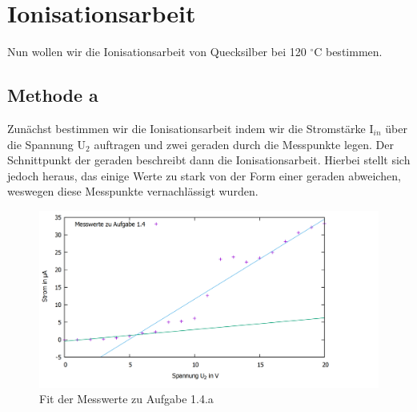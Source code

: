 \section{Ionisationsarbeit}
Nun wollen wir die Ionisationsarbeit von Quecksilber bei 120 $ ^\circ $C bestimmen.
\subsection{Methode a}
Zunächst bestimmen wir die Ionisationsarbeit indem wir die Stromstärke I$ _{in} $ über die Spannung U$ _2 $ auftragen und zwei geraden durch die Messpunkte legen. Der Schnittpunkt der geraden beschreibt dann die Ionisationsarbeit. Hierbei stellt sich jedoch heraus, das einige Werte zu stark von der Form einer geraden abweichen, weswegen diese Messpunkte vernachlässigt wurden. 
\begin{figure}
	\includegraphics[width=\textwidth]{../Daten/Aufgabe1/Aufgabe1_4.png}
	\caption{Fit der Messwerte zu Aufgabe 1.4.a}
\end{figure}

